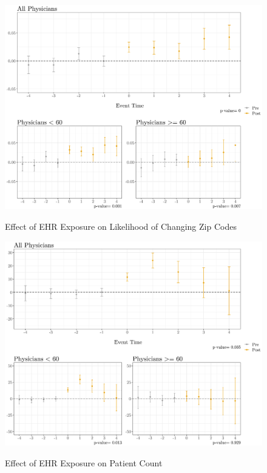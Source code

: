 \documentclass[11pt]{article}
\begin{document}
\begin{figure}[p]
    \centering
    \caption{Effect of EHR Exposure on Likelihood of Changing Zip Codes}
    \includegraphics[scale=.57]{Objects/zip_plot.pdf}
    \label{fig:zip}
\end{figure}

\begin{figure}[p]
    \centering
    \caption{Effect of EHR Exposure on Patient Count}
    \includegraphics[scale=.57]{Objects/patient_plot.pdf}
    \label{fig:patient}
\end{figure}
\end{document}
